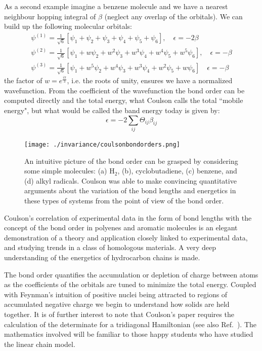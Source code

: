 As a second example imagine a benzene molecule and we have a nearest neighbour 
hopping integral of $\beta$ (neglect any overlap of the orbitals).
We can build up the following molecular orbitals:
%
\begin{align}
\psi^{(1)} = \frac{1}{\sqrt{6}}[\psi_{1} +\psi_{2} +\psi_{3} + \psi_{4} + \psi_{5} + \psi_{6}],\quad \epsilon=-2\beta\\
\psi^{(2)} = \frac{1}{\sqrt{6}}[\psi_{1} + w\psi_{2} + w^2\psi_{3} + w^3\psi_{4} + w^4\psi_{5} + w^5\psi_{6}],\quad \epsilon=-\beta\\
\psi^{(3)} = \frac{1}{\sqrt{6}}[\psi_{1} + w^5\psi_{2} +w^4\psi_{3} + w^3\psi_{4} + w^2\psi_{5} + w\psi_{6}]\quad \epsilon=-\beta
\end{align}
%
the factor of $w=e^{\frac{i\pi}{3}}$, i.e. the roots of unity, ensures we have a normalized wavefunction. 
From the coefficient of the wavefunction the bond order can be computed directly and the total energy,
what Coulson calls the total ``mobile energy", but what would be called the band energy today is
given by:
%
\begin{equation}
\epsilon = -2\sum_{ij}\Theta_{ij}\beta_{ij}
\end{equation}
%
\begin{figure}
\begin{center}
\texttt{[image: ./invariance/coulsonbondorders.png]}
\caption{An intuitive picture of the bond order can 
be grasped by considering some simple molecules: (a) H$_{2}$,
(b), cyclobutadiene, (c) benzene, and (d) alkyl radicals.
Coulson was able to make convincing quantitative 
arguments about the variation of the bond lengths and energetics
in these types of systems from the point of view of the bond order. 
\label{fig:coulsonmolecules}}
\end{center}
\end{figure}

Coulson's correlation of experimental data in the form of bond lengths
with the concept of the bond order in polyenes and aromatic molecules
is an elegant demonstration of a theory and application closely
linked to experimental data, and studying trends in a class of
homologous materials. A very deep understanding of the energetics of 
hydrocarbon chains is made.

The bond order quantifies the accumulation or depletion of charge between
atoms as the coefficients of the orbitals are tuned to minimize the total energy.
Coupled with Feynman's intuition of positive nuclei being attracted to regions
of accumulated negative charge we begin to understand how solids are held together\cite{feynman39}.
It is of further interest to note that Coulson's paper requires the calculation of 
the determinate for a tridiagonal Hamiltonian (see also Ref.~\cite{coulson38}). 
The mathematics involved will be familiar to those happy students 
who have studied the linear chain model.

